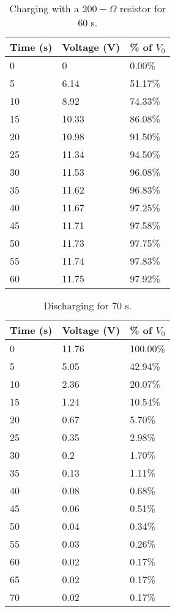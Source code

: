 \documentclass[11pt, titlepage, letterpaper, twoside]{article}
\begin{document}
\begin{table}[h!]
\centering
\caption{Charging with a $200-\Omega$ resistor for 60 s.}
\label{charging-2}
\begin{tabular}{|l|l|l|}
\hline
Time (s) & Voltage (V) & \% of $V_0$ \\ \hline
0        & 0           & 0.00\%     \\ \hline
5        & 6.14        & 51.17\%    \\ \hline
10       & 8.92        & 74.33\%    \\ \hline
15       & 10.33       & 86.08\%    \\ \hline
20       & 10.98       & 91.50\%    \\ \hline
25       & 11.34       & 94.50\%    \\ \hline
30       & 11.53       & 96.08\%    \\ \hline
35       & 11.62       & 96.83\%    \\ \hline
40       & 11.67       & 97.25\%    \\ \hline
45       & 11.71       & 97.58\%    \\ \hline
50       & 11.73       & 97.75\%    \\ \hline
55       & 11.74       & 97.83\%    \\ \hline
60       & 11.75       & 97.92\%    \\ \hline
\end{tabular}
\end{table}

\begin{table}[h!]
\centering
\caption{Discharging for 70 s.}
\label{discharging-2}
\begin{tabular}{|l|l|l|}
\hline
Time (s) & Voltage (V) & \% of $V_0$ \\ \hline
0        & 11.76       & 100.00\%    \\ \hline
5        & 5.05        & 42.94\%     \\ \hline
10       & 2.36        & 20.07\%     \\ \hline
15       & 1.24        & 10.54\%     \\ \hline
20       & 0.67        & 5.70\%      \\ \hline
25       & 0.35        & 2.98\%      \\ \hline
30       & 0.2         & 1.70\%      \\ \hline
35       & 0.13        & 1.11\%      \\ \hline
40       & 0.08        & 0.68\%      \\ \hline
45       & 0.06        & 0.51\%      \\ \hline
50       & 0.04        & 0.34\%      \\ \hline
55       & 0.03        & 0.26\%      \\ \hline
60       & 0.02        & 0.17\%      \\ \hline
65       & 0.02        & 0.17\%      \\ \hline
70       & 0.02        & 0.17\%      \\ \hline
\end{tabular}
\end{table}
\end{document}
